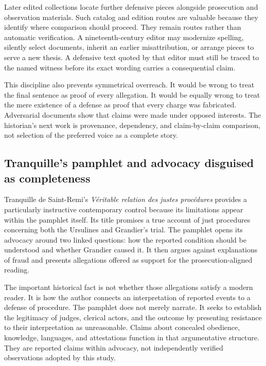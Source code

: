 Later edited collections locate further defensive pieces alongside
prosecution and observation materials.  Such catalog and edition routes are
valuable because they identify where comparison should proceed.  They remain
routes rather than automatic verification.  A nineteenth-century editor may
modernize spelling, silently select documents, inherit an earlier
misattribution, or arrange pieces to serve a new thesis.  A defensive text
quoted by that editor must still be traced to the named witness before its
exact wording carries a consequential claim.

This discipline also prevents symmetrical overreach.  It would be wrong to
treat the final sentence as proof of every allegation.  It would be equally
wrong to treat the mere existence of a defense as proof that every charge was
fabricated.  Adversarial documents show that claims were made under opposed
interests.  The historian's next work is provenance, dependency, and
claim-by-claim comparison, not selection of the preferred voice as a complete
story.

\subsection{Tranquille's pamphlet and advocacy disguised as completeness}

Tranquille de Saint-Remi's \emph{Véritable relation des justes procédures}
provides a particularly instructive contemporary control because its
limitations appear within the pamphlet itself.  Its title promises a true
account of just procedures concerning both the Ursulines and Grandier's
trial.  The pamphlet opens its advocacy around two linked questions: how the
reported condition should be understood and whether Grandier caused it.  It
then argues against explanations of fraud and presents allegations offered as
support for the prosecution-aligned reading.

The important historical fact is not whether those allegations satisfy a
modern reader.  It is how the author connects an interpretation of reported
events to a defense of procedure.  The pamphlet does not merely narrate.  It
seeks to establish the legitimacy of judges, clerical actors, and the outcome
by presenting resistance to their interpretation as unreasonable.  Claims
about concealed obedience, knowledge, languages, and attestations function in
that argumentative structure.  They are reported claims within advocacy, not
independently verified observations adopted by this study.

